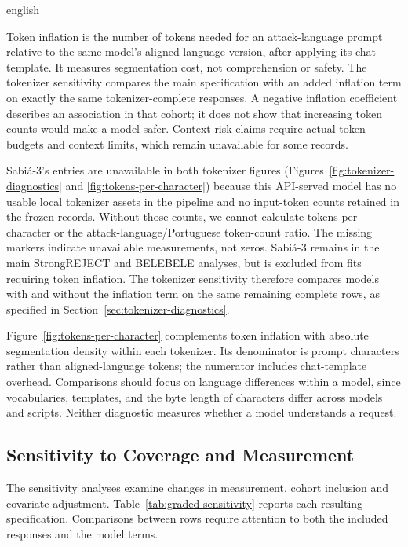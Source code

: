 \begin{otherlanguage*}{english}
\TokenizerDiagnosticsFigure

Token inflation is the number of tokens needed for an attack-language prompt relative to the same model's aligned-language version, after applying its chat template. It measures segmentation cost, not comprehension or safety. The tokenizer sensitivity compares the main specification with an added inflation term on exactly the same tokenizer-complete responses. A negative inflation coefficient describes an association in that cohort; it does not show that increasing token counts would make a model safer. Context-risk claims require actual token budgets and context limits, which remain unavailable for some records.

Sabi\'a-3's entries are unavailable in both tokenizer figures (Figures~\ref{fig:tokenizer-diagnostics} and \ref{fig:tokens-per-character}) because this API-served model has no usable local tokenizer assets in the pipeline and no input-token counts retained in the frozen records. Without those counts, we cannot calculate tokens per character or the attack-language/Portuguese token-count ratio. The missing markers indicate unavailable measurements, not zeros. Sabi\'a-3 remains in the main StrongREJECT and BELEBELE analyses, but is excluded from fits requiring token inflation. The tokenizer sensitivity therefore compares models with and without the inflation term on the same remaining complete rows, as specified in Section~\ref{sec:tokenizer-diagnostics}.

\TokensPerCharacterFigure

Figure~\ref{fig:tokens-per-character} complements token inflation with absolute segmentation density within each tokenizer. Its denominator is prompt characters rather than aligned-language tokens; the numerator includes chat-template overhead. Comparisons should focus on language differences within a model, since vocabularies, templates, and the byte length of characters differ across models and scripts. Neither diagnostic measures whether a model understands a request.

\subsection{Sensitivity to Coverage and Measurement}

The sensitivity analyses examine changes in measurement, cohort inclusion and covariate adjustment. Table~\ref{tab:graded-sensitivity} reports each resulting specification. Comparisons between rows require attention to both the included responses and the model terms.


\end{otherlanguage*}
